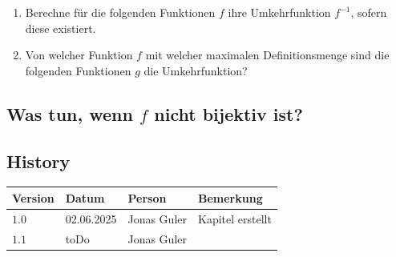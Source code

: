 \documentclass[11pt,oneside]{article}
\begin{document}
	\begin{aufgabe}
		\begin{enumerate}
			\item Berechne für die folgenden Funktionen $f$ ihre Umkehrfunktion $f^{-1}$, sofern diese existiert.
			\item Von welcher Funktion $f$ mit welcher maximalen Definitionsmenge sind die folgenden Funktionen $g$ die Umkehrfunktion?
		\end{enumerate}
	\end{aufgabe}

\subsection{Was tun, wenn $f$ nicht bijektiv ist?}



\newpage
\subsection*{History}
\begin{table}[H]
	\centering
	\begin{tabular}{|p{13mm}|p{20mm}|p{30mm}|p{70mm}|}\hline
		Version & Datum & Person & Bemerkung \\\hline
		$1.0$ & 02.06.2025 & Jonas Guler & Kapitel erstellt \\\hline
		$1.1$ & toDo & Jonas Guler &  \\\hline
	\end{tabular}
\end{table}
\end{document}
